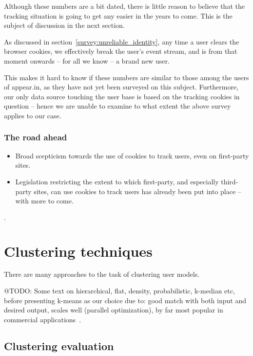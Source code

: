 Although these numbers are a bit dated, there is little reason to believe that the tracking situation is going to get any easier in the years to come. This is the subject of discussion in the next section.

As discussed in section~\ref{survey:unreliable_identity}, any time a user clears the browser cookies, we effectively break the user's event stream, and is from that moment onwards -- for all we know -- a brand new user.

This makes it hard to know if these numbers are similar to those among the users of appear.in, as they have not yet been surveyed on this subject. Furthermore, our only data source touching the user base is based on the tracking cookies in question -- hence we are unable to examine to what extent the above survey applies to our case.

\subsubsection{The road ahead}

\begin{itemize}
  \item Broad scepticism towards the use of cookies to track users, even on first-party sites.
  \item Legislation restricting the extent to which first-party, and especially third-party sites, can use cookies to track users has already been put into place -- with more to come.
\end{itemize}

\cite{RuizMartinez2012,Nikiforakis2013,Sorensen2013,Eijk2011}.

\section{Clustering techniques}
\label{survey:sec:clustering_techniques}

There are many approaches to the task of clustering user models.

@TODO: Some text on hierarchical, flat, density, probabilistic, k-median etc, before presenting k-means as our choice due to: good match with both input and desired output, scales well (parallel optimization), by far most popular in commercial applications~\cite{Berkhin2006}.

\subsection{Clustering evaluation}
\label{survey:sub:clustering_evaluation}


